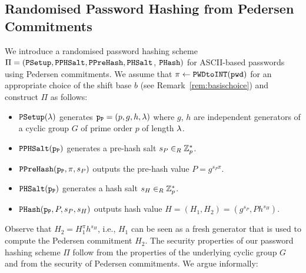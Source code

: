 \subsection{Randomised Password Hashing from Pedersen Commitments}\label{sec:pwhashped}
We introduce a randomised password hashing scheme $\Pi=(\mathtt{PSetup},\mathtt{PPHSalt},\allowbreak\mathtt{PPreHash},\allowbreak\mathtt{PHSalt}$, $\mathtt{PHash})$ for ASCII-based passwords using Pedersen commitments. We assume that $\pi\gets\texttt{PWDtoINT}(\mathtt{pwd})$ for an appropriate choice of the shift base $b$ (see Remark~\ref{rem:basischoice}) and construct $\Pi$ as follows:
\begin{itemize}
	\item $\mathtt{PSetup}(\lambda)$ generates $\mathtt{p_P}= (p,g,h,\lambda)$ where $g$, $h$ are independent generators of a cyclic group $G$ of prime order $p$ of length $\lambda$.
	\item $\mathtt{PPHSalt}(\mathtt{p_P})$ generates a pre-hash salt $s_P\in_R\mathbb{Z}^\ast_p$.
	\item $\mathtt{PPreHash}(\mathtt{p_P}, \pi, s_P)$ outputs the pre-hash value $P=g^{s_P\pi}$.
	\item $\mathtt{PHSalt}(\mathtt{p_P})$ generates a hash salt $s_H\in_R\mathbb{Z}^\ast_p$.
	\item $\mathtt{PHash}(\mathtt{p_P}, P, s_P, s_H)$ outputs hash value $H=(H_1, H_2)=(g^{s_P}, Ph^{s_H})$.
\end{itemize}
Observe that $H_2=H_1^\pi h^{s_H}$, i.e., $H_1$ can be seen as a fresh generator that is used to compute the Pedersen commitment $H_2$.
The security properties of our password hashing scheme $\Pi$ follow from the properties of the underlying cyclic group $G$ and from the security of Pedersen commitments. We argue informally:
